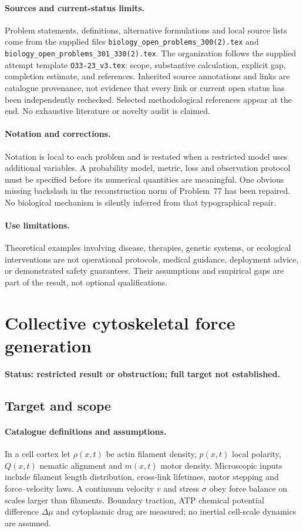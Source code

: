 \documentclass[11pt]{article}
\begin{document}
\paragraph{Sources and current-status limits.}
Problem statements, definitions, alternative formulations and local source lists
come from the supplied files
\texttt{biology\_open\_problems\_300(2).tex} and
\texttt{biology\_open\_problems\_301\_330(2).tex}.
The organization follows the supplied attempt template
\texttt{O33-23\_v3.tex}: scope, substantive calculation, explicit gap,
completion estimate, and references. Inherited source annotations and links are
catalogue provenance, not evidence that every link or current open status has
been independently rechecked. Selected methodological references appear at the
end. No exhaustive literature or novelty audit is claimed.

\paragraph{Notation and corrections.}
Notation is local to each problem and is restated when a restricted model uses
additional variables. A probability model, metric, loss and observation protocol
must be specified before its numerical quantities are meaningful. One obvious
missing backslash in the reconstruction norm of Problem~77 has been repaired.
No biological mechanism is silently inferred from that typographical repair.

\paragraph{Use limitations.}
Theoretical examples involving disease, therapies, genetic systems, or ecological
interventions are not operational protocols, medical guidance, deployment advice,
or demonstrated safety guarantees. Their assumptions and empirical gaps are part
of the result, not optional qualifications.


\section*{Collective cytoskeletal force generation}
\label{prob:088}
\noindent\textbf{Status: restricted result or obstruction; full target not established.}
\subsection{Target and scope}
\paragraph{Catalogue definitions and assumptions.}
In a cell cortex let $\rho(x,t)$ be actin filament density, $p(x,t)$ local polarity, $Q(x,t)$ nematic alignment and $m(x,t)$ motor density. Microscopic inputs include filament length distribution, cross-link lifetimes, motor stepping and force--velocity laws. A continuum velocity $v$ and stress $\sigma$ obey force balance on scales larger than filaments. Boundary traction, ATP chemical potential difference $\Delta\mu$ and cytoplasmic drag are measured; no inertial cell-scale dynamics are assumed.
\end{document}
